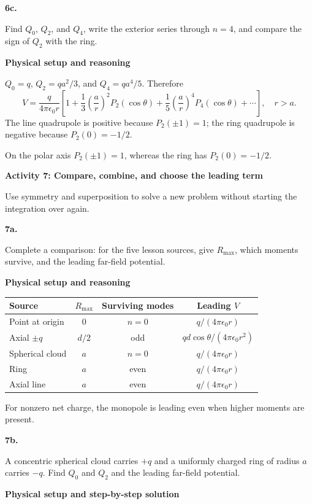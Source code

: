 \documentclass[11pt]{article}
\newcommand{\topic}[1]{\par{\Large\bfseries\color{navy}#1}\par}
\newcommand{\q}[2]{\par\bigskip\noindent\textbf{\color{navy}#1}\par\smallskip #2\par\medskip}
\newcommand{\bridge}[1]{\begin{tcolorbox}[colback=white,colframe=amber,title=Physical starting point,fonttitle=\bfseries,boxrule=.5pt,breakable]#1\end{tcolorbox}}
\newcommand{\stage}[1]{\par\medskip\noindent\textbf{\color{blue}#1}\par\smallskip}
\newcommand{\connect}[1]{\begin{tcolorbox}[colback=blue!4,colframe=blue!45,title=Keep the thread,fonttitle=\bfseries,boxrule=.45pt,breakable]#1\end{tcolorbox}}
\begin{document}
\q{6c.}{Find $Q_0$, $Q_2$, and $Q_4$, write the exterior series through $n=4$, and compare the sign of $Q_2$ with the ring.}
\stage{Physical setup and reasoning}

$Q_0=q$, $Q_2=qa^2/3$, and $Q_4=qa^4/5$. Therefore 
\[V=\frac{q}{4\pi\epsilon_0r}\left[1+\frac13\left(\frac ar\right)^2P_2(\cos\theta)+\frac15\left(\frac ar\right)^4P_4(\cos\theta)+\cdots\right],\quad r>a.\]
 The line quadrupole is positive because $P_2(\pm1)=1$; the ring quadrupole is negative because $P_2(0)=-1/2$.
\connect{On the polar axis $P_2(\pm1)=1$, whereas the ring has $P_2(0)=-1/2$.}

\newpage
\topic{Activity 7: Compare, combine, and choose the leading term}
\bridge{Use symmetry and superposition to solve a new problem without starting the integration over again.}

\q{7a.}{Complete a comparison: for the five lesson sources, give $R_{\max}$, which moments survive, and the leading far-field potential.}
\stage{Physical setup and reasoning}

\begin{center}\small\begin{tabular}{lccc}Source&$R_{\max}$&Surviving modes&Leading $V$\\\hline Point at origin&$0$&$n=0$&$q/(4\pi\epsilon_0r)$\\ Axial $\pm q$&$d/2$&odd&$qd\cos\theta/(4\pi\epsilon_0r^2)$\\ Spherical cloud&$a$&$n=0$&$q/(4\pi\epsilon_0r)$\\ Ring&$a$&even&$q/(4\pi\epsilon_0r)$\\ Axial line&$a$&even&$q/(4\pi\epsilon_0r)$\end{tabular}\end{center}
\connect{For nonzero net charge, the monopole is leading even when higher moments are present.}

\q{7b.}{A concentric spherical cloud carries $+q$ and a uniformly charged ring of radius $a$ carries $-q$. Find $Q_0$ and $Q_2$ and the leading far-field potential.}
\stage{Physical setup and step-by-step solution}
\end{document}
